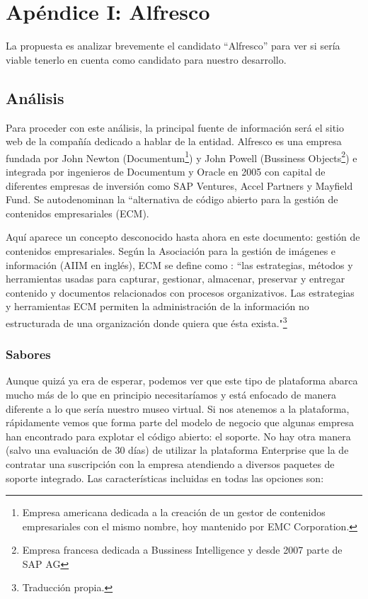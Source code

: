 \section{Apéndice I: Alfresco}
\label{cha:apendicealfresco}
\par La propuesta es analizar brevemente el candidato ``Alfresco'' para ver si sería viable tenerlo en cuenta como candidato para nuestro desarrollo.

\subsection{Análisis}
\par Para proceder con este análisis, la principal fuente de información será el sitio web de la compañía dedicado a hablar de la entidad. Alfresco es una empresa fundada por John Newton (Documentum\footnote{Empresa americana dedicada a la creación de un gestor de contenidos empresariales con el mismo nombre, hoy mantenido por EMC Corporation.\cite{references:documentum}}) y John Powell (Bussiness Objects\footnote{Empresa francesa dedicada a Bussiness Intelligence y desde 2007 parte de SAP AG\cite{references:bussinessobjects}}) e integrada por ingenieros de Documentum y Oracle en 2005 con capital de diferentes empresas de inversión como SAP Ventures, Accel Partners y Mayfield Fund. Se autodenominan la ``alternativa de código abierto para la gestión de contenidos empresariales (ECM)\cite{references:alfrescoabout}.
\par Aquí aparece un concepto desconocido hasta ahora en este documento: gestión de contenidos empresariales. Según la Asociación para la gestión de imágenes e información (AIIM en inglés), ECM se define como \cite{references:ecmaiim}: ``las estrategias, métodos y herramientas usadas para capturar, gestionar, almacenar, preservar y entregar contenido y documentos relacionados con procesos organizativos. Las estrategias y herramientas ECM permiten la administración de la información no estructurada de una organización donde quiera que ésta exista."\renewcommand{\thefootnote}{\fnsymbol{footnote}}\footnote[1]{Traducción propia.}\renewcommand{\thefootnote}{\arabic{footnote}}

\subsubsection{Sabores}
\par Aunque quizá ya era de esperar, podemos ver que este tipo de plataforma abarca mucho más de lo que en principio necesitaríamos y está enfocado de manera diferente a lo que sería nuestro museo virtual. Si nos atenemos a la plataforma, rápidamente vemos que forma parte del modelo de negocio que algunas empresa han encontrado para explotar el código abierto: el soporte. No hay otra manera (salvo una evaluación de 30 días) de utilizar la plataforma Enterprise que la de contratar una suscripción con la empresa atendiendo a diversos paquetes de soporte integrado. Las características incluidas en todas las opciones son:

